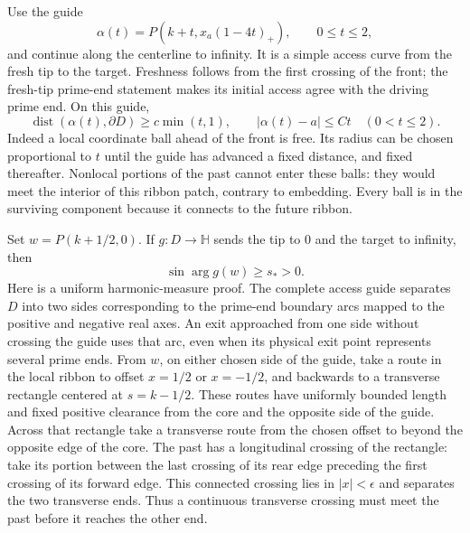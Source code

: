 Use the guide
\[
 \alpha(t)=P(k+t,x_a(1-4t)_+),\qquad 0\le t\le2,
\]
and continue along the centerline to infinity.  It is a simple access
curve from the fresh tip to the target.  Freshness follows from the first
crossing of the front; the fresh-tip prime-end statement makes its
initial access agree with the driving prime end.  On this guide,
\begin{equation}\label{rc:guide-clearance}
 \operatorname{dist}(\alpha(t),\partial D)\ge c\min(t,1),
 \qquad |\alpha(t)-a|\le Ct\quad(0<t\le2).
\end{equation}
Indeed a local coordinate ball ahead of the front is free.  Its radius
can be chosen proportional to $t$ until the guide has advanced a fixed
distance, and fixed thereafter.  Nonlocal portions of the past cannot
enter these balls: they would meet the interior of this ribbon patch,
contrary to embedding.  Every ball is in the surviving component because
it connects to the future ribbon.

Set $w=P(k+1/2,0)$.  If $g:D\to\mathbb H$ sends the tip to $0$ and the
target to infinity, then
\begin{equation}\label{rc:waypoint-angle}
 \sin\arg g(w)\ge s_*>0.
\end{equation}
Here is a uniform harmonic-measure proof. The complete access guide
separates $D$ into two sides corresponding to the prime-end boundary
arcs mapped to the positive and negative real axes. An exit approached
from one side without crossing the guide uses that arc, even when its
physical exit point represents several prime ends. From $w$, on either
chosen side of the guide, take a route in the local ribbon to offset
$x=1/2$ or $x=-1/2$,
and backwards to a transverse rectangle centered at $s=k-1/2$.
These routes have uniformly bounded length and fixed positive clearance
from the core and the opposite side of the guide.  Across that rectangle
take a transverse route from the chosen offset to beyond the opposite
edge of the core.  The past has a longitudinal crossing of the rectangle:
take its portion between the last crossing of its rear edge preceding
the first crossing of its forward edge.  This connected crossing lies
in $|x|<\epsilon$ and separates the two transverse ends.  Thus a
continuous transverse crossing must meet the past before it reaches the
other end.

